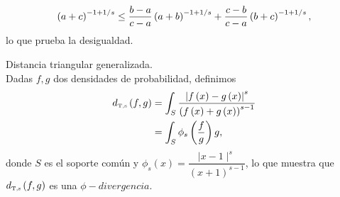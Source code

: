 \begin{dem}
\begin{enumerate}[i)]
		\begin{align*}
		\left( a+c \right)^{-1+1/s} \le \frac{b-a}{c-a} \left( a+b \right)^{-1+1/s}
		+ \frac{c-b}{c-a} \left( b+c \right)^{-1+1/s},
		\end{align*}
		lo que prueba la desigualdad.
	\end{enumerate}
\end{dem}

\begin{definition} Distancia triangular generalizada.\\
	\label{TriangularGeneralizada}
	Dadas $f,g$ dos densidades de probabilidad, definimos
	\begin{align}
	\nonumber \label{FiDT}d_{\text{\tiny{T},s}}\left( f,g \right) &= \displaystyle \int_{S} \dfrac{\left| f\left( x \right) - g\left( x \right) \right|^s}{\left( f\left( x \right) + g\left( x \right) \right)^{s-1}} \\
	&= \displaystyle \int_{S} \phi_s\left(\frac{f}{g}\right) g,
	\end{align}
	donde $S$ es el soporte común y $\phi_s(x)=\dfrac{\mid x-1\mid^s}{(x+1)^{s-1}}$,  lo que muestra que $d_{\text{\tiny{T},s}}\left( f,g \right)$ es una $\phi-divergencia$.
\end{definition}

